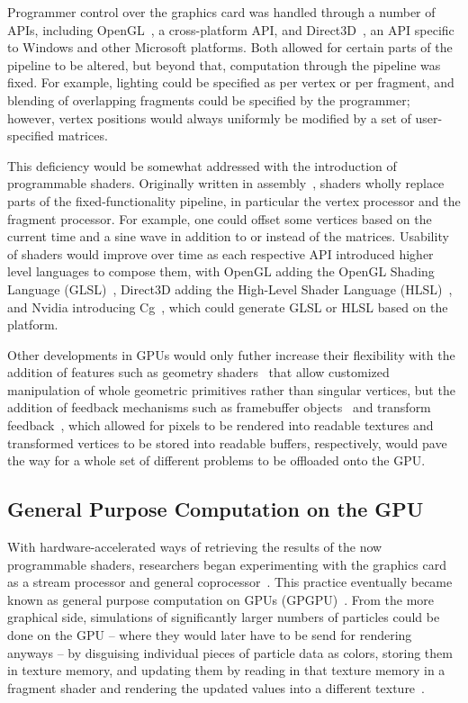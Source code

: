 Programmer control over the graphics card was handled through a number
of APIs, including OpenGL~\cite{opengl}, a cross-platform API, and
Direct3D~\cite{direct3d}, an API specific to Windows and other Microsoft
platforms. Both allowed for certain parts of the pipeline to be altered,
but beyond that, computation through the pipeline was fixed.
For example, lighting could be specified as per vertex or per fragment, and
blending of overlapping fragments could be specified by the programmer; however,
vertex positions would always uniformly be modified by a set of user-specified
matrices.

This deficiency would be somewhat addressed with the introduction of
programmable shaders. Originally written in assembly~\cite{asm_shaders},
shaders wholly replace parts of the fixed-functionality pipeline, in
particular the vertex processor and the fragment processor. For example,
one could offset some vertices based on the current time and a sine wave
in addition to or instead of the matrices. Usability of shaders would improve
over time as each respective API introduced higher level languages to compose
them, with OpenGL adding the OpenGL Shading Language (GLSL)~\cite{glsl}, Direct3D
adding the High-Level Shader Language (HLSL)~\cite{hlsl}, and Nvidia introducing
Cg~\cite{cg}, which could generate GLSL or HLSL based on the platform.

Other developments in GPUs would only futher increase their
flexibility with the addition of features such as geometry
shaders~\cite{geometry_shader} that allow customized manipulation of whole
geometric primitives rather than singular vertices, but the addition of
feedback mechanisms such as framebuffer objects~\cite{framebuffer_object}
and transform feedback~\cite{transform_feedback}, which allowed for
pixels to be rendered into readable textures and transformed vertices
to be stored into readable buffers, respectively, would pave the way
for a whole set of different problems to be offloaded onto the GPU.

\subsection{General Purpose Computation on the GPU}

With hardware-accelerated ways of retrieving the results of
the now programmable shaders, researchers began experimenting
with the graphics card as a stream processor and general
coprocessor~\cite{graphics_stream}. This practice eventually became known
as general purpose computation on GPUs (GPGPU)~\cite{gpgpu}. From the more graphical side,
simulations of significantly larger numbers of particles could be done on
the GPU -- where they would later have to be send for rendering anyways --
by disguising individual pieces of particle data as colors, storing them
in texture memory, and updating them by reading in that texture memory
in a fragment shader and rendering the updated values into a different
texture~\cite{million_particle}.

